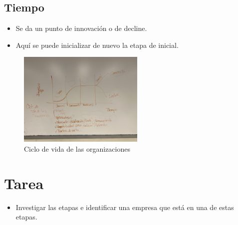 \subsection{Tiempo}
\begin{itemize}
    \item Se da un punto de innovación o de decline.
    \item Aquí se puede inicializar de nuevo la etapa de inicial.
\end{itemize}



\begin{figure}[htbp]
    \centering
    \includegraphics[width=6cm]{Clases/Images/2020-01-15-CicloDeVidaOrganizacion.jpeg}
    \caption{Ciclo de vida de las organizaciones}
    \label{}
\end{figure} 


\section*{Tarea}
\begin{itemize}
    \item Investigar las etapas e identificar una empresa que está en una de estas etapas.
\end{itemize}
